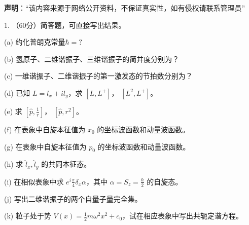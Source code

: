 
\textbf{声明}：“该内容来源于网络公开资料，不保证真实性，如有侵权请联系管理员”

1. （60分）简答题，可直接写出结果。

(a) 约化普朗克常量$\hbar = ?$

(b) 氢原子、二维谐振子、三维谐振子的简并度分别为？

(c) 一维谐振子、二维谐振子的第一激发态的节拍数分别为？

(d) 已知 $L = l_x + il_y $，求 $[L, L^+]$， $[L^2, L^+]$。

(e) 求 $[\hat p, \frac{1}{r}]$， $[\hat p, r^2]$。

(f) 在表象中自旋本征值为 $x_0$ 的坐标波函数和动量波函数。

(g) 在表象中自旋本征值为 $p_0$ 的坐标波函数和动量波函数。

(h) 求 $\hat l_x,\hat l_y$ 的共同本征态。

(i) 在相似表象中求 $e^i\frac{\pi}{4}\delta_x\alpha$，其中 $\alpha = S_z =\frac{\hbar}{2} $ 的自旋态。

(j) 写出二维谐振子的两个自量子量完全集。

(k) 粒子处于势 $V(x) = \frac{1}{2}m\omega^2x^2 + c_0$，试在相应表象中写出共轭定谐方程。
